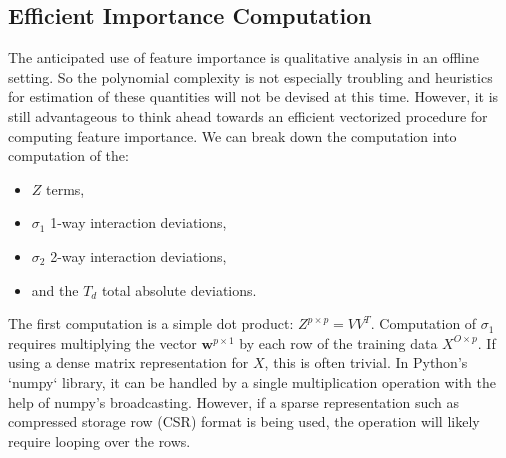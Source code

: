 \documentclass[10pt]{journal}
\begin{document}
\subsection{Efficient Importance Computation}

The anticipated use of feature importance is qualitative analysis in an offline
setting. So the polynomial complexity is not especially troubling and heuristics
for estimation of these quantities will not be devised at this time. However, it
is still advantageous to think ahead towards an efficient vectorized procedure
for computing feature importance. We can break down the computation into
computation of the:

\begin{itemize}
    \item  $Z$ terms,
    \item  $\sigma_1$ 1-way interaction deviations,
    \item  $\sigma_2$ 2-way interaction deviations,
    \item  and the $T_d$ total absolute deviations.
\end{itemize}

The first computation is a simple dot product: $Z^{p \times p} = V V^T$.
Computation of $\sigma_1$ requires multiplying the vector $\bm{w}^{p \times 1}$
by each row of the training data $X^{O \times p}$. If using a dense matrix
representation for $X$, this is often trivial. In Python's `numpy` library, it
can be handled by a single multiplication operation with the help of numpy's
broadcasting. However, if a sparse representation such as compressed storage row
(CSR) format is being used, the operation will likely require looping over the
rows.
\end{document}

